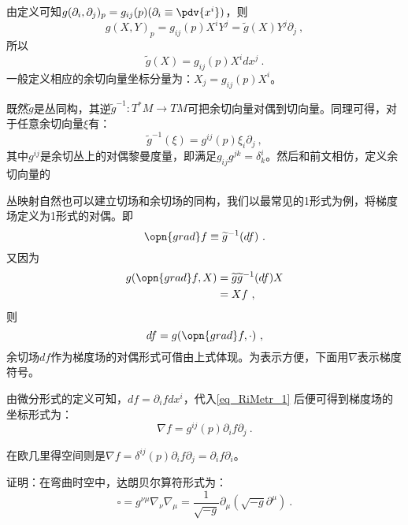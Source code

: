 由定义可知$g(\partial_i,\partial_j)_p=g_{ij}(p)(\partial_i\equiv\pdv{x^i})$，则
\begin{equation}
g(X,Y)_p=g_{ij}(p)X^iY^j=\widetilde g(X)Y^j\partial_j~,
\end{equation}
所以
\begin{equation}
\widetilde g(X)=g_{ij}(p)X^idx^j~.
\end{equation}
一般定义相应的余切向量坐标分量为：$X_j=g_{ij}(p)X^i$。

既然$\widetilde g$是丛同构，其逆$\widetilde g^{-1}:T^*M\rightarrow TM$可把余切向量对偶到切向量。同理可得，对于任意余切向量$\xi$有：
\begin{equation}\label{eq_RiMetr_1}
\widetilde g^{-1}(\xi)=g^{ij}(p) \xi_i\partial_j~,
\end{equation}
其中$g^{ij}$是余切丛上的对偶黎曼度量，即满足$g_{ij}g^{jk}=\delta^i_k$。然后和前文相仿，定义余切向量的

丛映射自然也可以建立切场和余切场的同构，我们以最常见的1形式为例，将梯度场定义为1形式的对偶。即
\begin{equation}
\opn{grad} f\equiv \widetilde g^{-1}(df)~.
\end{equation}
又因为
\begin{equation}
\begin{aligned}
g(\opn{grad}f,X)&=\widetilde g\widetilde g^{-1}(df)X\\
&=Xf~,
\end{aligned}
\end{equation}
则
\begin{equation}
df=g(\opn{grad}f,\cdot)~,
\end{equation}
余切场$df$作为梯度场的对偶形式可借由上式体现。为表示方便，下面用$\nabla$表示梯度符号。

由微分形式的定义可知，$df=\partial_i fdx^i$，代入\autoref{eq_RiMetr_1} 后便可得到梯度场的坐标形式为：
\begin{equation}
\nabla f=g^{ij}(p)\partial_i f\partial_j~.
\end{equation}

在欧几里得空间则是$\nabla f=\delta^{ij}(p)\partial_i f\partial_j=\partial_i f\partial_i$。
\begin{exercise}{}
证明：在弯曲时空中，达朗贝尔算符形式为：
\begin{equation}
\square=g^{\nu \mu} \nabla_{\nu} \nabla_{\mu}=\frac{1}{\sqrt{-g}} \partial_{\mu}\left(\sqrt{-g} \partial^{\mu}\right)~.
\end{equation}
\end{exercise}

